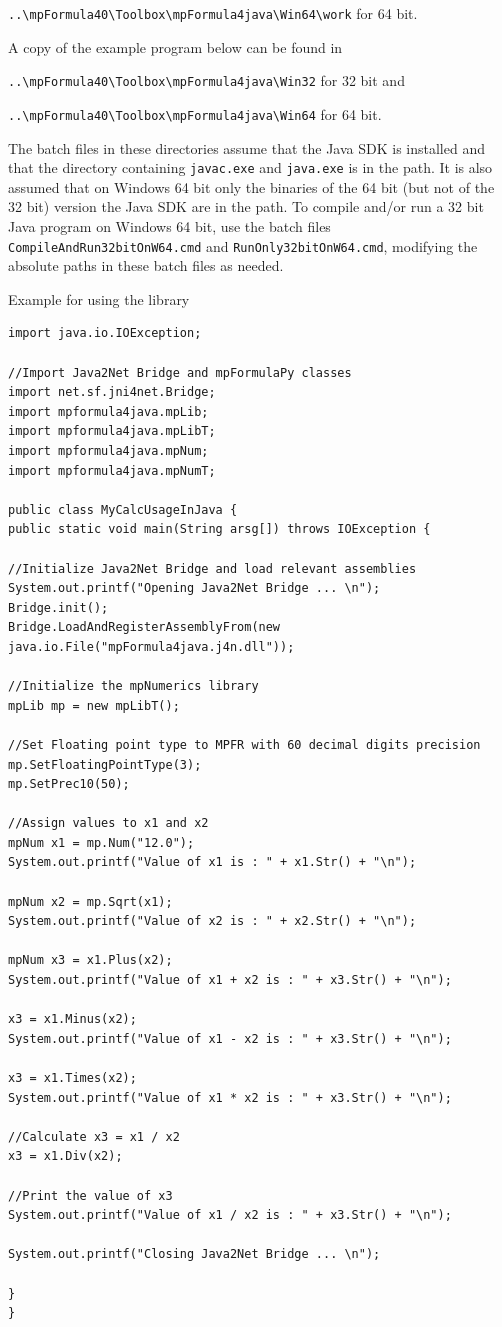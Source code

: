 \verb|..\mpFormula40\Toolbox\mpFormula4java\Win64\work| for 64 bit.

\vpara
A copy of the example program below can be found in 

\verb|..\mpFormula40\Toolbox\mpFormula4java\Win32| for 32 bit and 

\verb|..\mpFormula40\Toolbox\mpFormula4java\Win64| for 64 bit.

\vpara
The batch files in these directories assume that the Java SDK is installed and that the directory containing \verb|javac.exe| and \verb|java.exe| is in the path. It is also assumed that on Windows 64 bit only the binaries of the 64 bit (but not of the 32 bit) version the Java SDK are in the path. To compile and/or run a 32 bit Java program on Windows 64 bit, use the batch files \verb|CompileAndRun32bitOnW64.cmd| and \verb|RunOnly32bitOnW64.cmd|, modifying the absolute paths in these batch files as needed.

\vpara
Example for using the library

\begin{lstlisting}
import java.io.IOException;

//Import Java2Net Bridge and mpFormulaPy classes
import net.sf.jni4net.Bridge;
import mpformula4java.mpLib;
import mpformula4java.mpLibT;
import mpformula4java.mpNum;
import mpformula4java.mpNumT;

public class MyCalcUsageInJava {
public static void main(String arsg[]) throws IOException {

//Initialize Java2Net Bridge and load relevant assemblies
System.out.printf("Opening Java2Net Bridge ... \n");
Bridge.init();
Bridge.LoadAndRegisterAssemblyFrom(new java.io.File("mpFormula4java.j4n.dll"));

//Initialize the mpNumerics library
mpLib mp = new mpLibT();

//Set Floating point type to MPFR with 60 decimal digits precision
mp.SetFloatingPointType(3);
mp.SetPrec10(50);

//Assign values to x1 and x2
mpNum x1 = mp.Num("12.0");
System.out.printf("Value of x1 is : " + x1.Str() + "\n");

mpNum x2 = mp.Sqrt(x1);
System.out.printf("Value of x2 is : " + x2.Str() + "\n");

mpNum x3 = x1.Plus(x2);
System.out.printf("Value of x1 + x2 is : " + x3.Str() + "\n");

x3 = x1.Minus(x2);
System.out.printf("Value of x1 - x2 is : " + x3.Str() + "\n");

x3 = x1.Times(x2);
System.out.printf("Value of x1 * x2 is : " + x3.Str() + "\n");

//Calculate x3 = x1 / x2
x3 = x1.Div(x2);

//Print the value of x3
System.out.printf("Value of x1 / x2 is : " + x3.Str() + "\n");

System.out.printf("Closing Java2Net Bridge ... \n");

}
}
\end{lstlisting}





